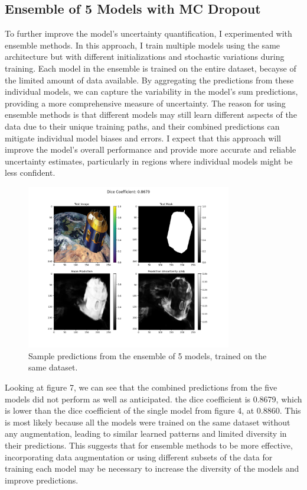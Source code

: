 \documentclass{article}
\begin{document}
\subsection{Ensemble of 5 Models with MC Dropout}

To further improve the model's uncertainty quantification, I experimented with ensemble methods. In this approach, I train 
multiple models using the same architecture but with different initializations and stochastic variations during training. 
Each model in the ensemble is trained on the entire dataset, becayse of the limited amount of data available. By aggregating 
the predictions from these individual models, we can capture the variability in the model's sum predictions, providing a more 
comprehensive measure of uncertainty. The reason for using ensemble methods is that different models may still learn  
different aspects of the data due to their unique training paths, and their combined predictions can mitigate 
individual model biases and errors. I expect that this approach will improve the model's overall performance and provide 
more accurate and reliable uncertainty estimates, particularly in regions where individual models might be less confident. 

\begin{figure}[h]
    \centering
    \includegraphics[width=0.8\textwidth]{../images/ensemble method/prediction.png}
    \caption{Sample predictions from the ensemble of 5 models, trained on the same dataset.}
    \label{fig:ensemble_predictions}
\end{figure}

\vspace{1em}
Looking at figure 7, we can see that the combined predictions from the five models did not perform as well as anticipated. 
the dice coefficient is 0.8679, which is lower than the dice coefficient of the single model from figure 4, at 0.8860.
This is most likely because all the models were trained on the same dataset without any augmentation, leading to similar 
learned patterns and limited diversity in their predictions. This suggests that for ensemble methods to be more effective, 
incorporating data augmentation or using different subsets of the data for training each model may be necessary to increase 
the diversity of the models and improve predictions.
\end{document}
